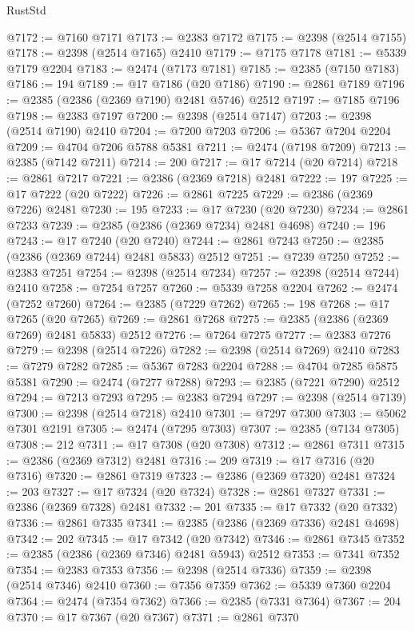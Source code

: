 \begin{lexlean}{RustStd}
\begin{coremodule}
@7172 := @7160 @7171
@7173 := @2383 @7172
@7175 := @2398 (@2514 @7155)
@7178 := @2398 (@2514 @7165) @2410
@7179 := @7175 @7178
@7181 := @5339 @7179 @2204
@7183 := @2474 (@7173 @7181)
@7185 := @2385 (@7150 @7183)
@7186 := 194
@7189 := @17 @7186 (@20 @7186)
@7190 := @2861 @7189
@7196 := @2385 (@2386 (@2369 @7190) @2481 @5746) @2512
@7197 := @7185 @7196
@7198 := @2383 @7197
@7200 := @2398 (@2514 @7147)
@7203 := @2398 (@2514 @7190) @2410
@7204 := @7200 @7203
@7206 := @5367 @7204 @2204
@7209 := @4704 @7206 @5788 @5381
@7211 := @2474 (@7198 @7209)
@7213 := @2385 (@7142 @7211)
@7214 := 200
@7217 := @17 @7214 (@20 @7214)
@7218 := @2861 @7217
@7221 := @2386 (@2369 @7218) @2481
@7222 := 197
@7225 := @17 @7222 (@20 @7222)
@7226 := @2861 @7225
@7229 := @2386 (@2369 @7226) @2481
@7230 := 195
@7233 := @17 @7230 (@20 @7230)
@7234 := @2861 @7233
@7239 := @2385 (@2386 (@2369 @7234) @2481 @4698)
@7240 := 196
@7243 := @17 @7240 (@20 @7240)
@7244 := @2861 @7243
@7250 := @2385 (@2386 (@2369 @7244) @2481 @5833) @2512
@7251 := @7239 @7250
@7252 := @2383 @7251
@7254 := @2398 (@2514 @7234)
@7257 := @2398 (@2514 @7244) @2410
@7258 := @7254 @7257
@7260 := @5339 @7258 @2204
@7262 := @2474 (@7252 @7260)
@7264 := @2385 (@7229 @7262)
@7265 := 198
@7268 := @17 @7265 (@20 @7265)
@7269 := @2861 @7268
@7275 := @2385 (@2386 (@2369 @7269) @2481 @5833) @2512
@7276 := @7264 @7275
@7277 := @2383 @7276
@7279 := @2398 (@2514 @7226)
@7282 := @2398 (@2514 @7269) @2410
@7283 := @7279 @7282
@7285 := @5367 @7283 @2204
@7288 := @4704 @7285 @5875 @5381
@7290 := @2474 (@7277 @7288)
@7293 := @2385 (@7221 @7290) @2512
@7294 := @7213 @7293
@7295 := @2383 @7294
@7297 := @2398 (@2514 @7139)
@7300 := @2398 (@2514 @7218) @2410
@7301 := @7297 @7300
@7303 := @5062 @7301 @2191
@7305 := @2474 (@7295 @7303)
@7307 := @2385 (@7134 @7305)
@7308 := 212
@7311 := @17 @7308 (@20 @7308)
@7312 := @2861 @7311
@7315 := @2386 (@2369 @7312) @2481
@7316 := 209
@7319 := @17 @7316 (@20 @7316)
@7320 := @2861 @7319
@7323 := @2386 (@2369 @7320) @2481
@7324 := 203
@7327 := @17 @7324 (@20 @7324)
@7328 := @2861 @7327
@7331 := @2386 (@2369 @7328) @2481
@7332 := 201
@7335 := @17 @7332 (@20 @7332)
@7336 := @2861 @7335
@7341 := @2385 (@2386 (@2369 @7336) @2481 @4698)
@7342 := 202
@7345 := @17 @7342 (@20 @7342)
@7346 := @2861 @7345
@7352 := @2385 (@2386 (@2369 @7346) @2481 @5943) @2512
@7353 := @7341 @7352
@7354 := @2383 @7353
@7356 := @2398 (@2514 @7336)
@7359 := @2398 (@2514 @7346) @2410
@7360 := @7356 @7359
@7362 := @5339 @7360 @2204
@7364 := @2474 (@7354 @7362)
@7366 := @2385 (@7331 @7364)
@7367 := 204
@7370 := @17 @7367 (@20 @7367)
@7371 := @2861 @7370

\end{coremodule}
\end{lexlean}

